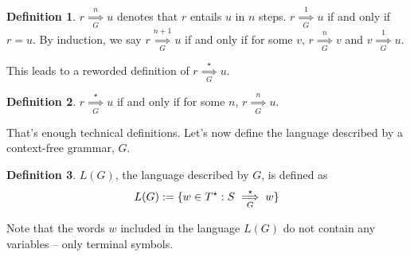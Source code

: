 \documentclass[]{article}
\DeclarePairedDelimiter{\set}{\lbrace}{\rbrace}
\theoremstyle{definition}
\newtheorem*{defn}{Definition}
\begin{document}
        \begin{defn}
          $r \underset{G}{\overset{n}{\implies}} u$ denotes that $r$ entails $u$ in $n$ steps. $r \underset{G}{\overset{1}{\implies}} u$ if and only if $r = u$. By induction, we say $r \underset{G}{\overset{n+1}{\implies}} u$ if and only if for some $v$, $r \underset{G}{\overset{n}{\implies}} v$ and $v \underset{G}{\overset{1}{\implies}} u$.
        \end{defn}

        This leads to a reworded definition of $r \underset{G}{\overset{\star}{\implies}} u$.
        \begin{defn}
          $r \underset{G}{\overset{\star}{\implies}} u$ if and only if for some $n$, $r \underset{G}{\overset{n}{\implies}} u$.
        \end{defn}

        That's enough technical definitions. Let's now define the language described by a context-free grammar, $G$.

        \begin{defn}
          $L(G)$, the language described by $G$, is defined as
          $$
            L(G) := \set{ w \in T^\star : S \underset{G}{\overset{\star}{\implies}} w}
          $$
        \end{defn}

        Note that the words $w$ included in the language $L(G)$ do not contain any variables -- only terminal symbols.
\end{document}
